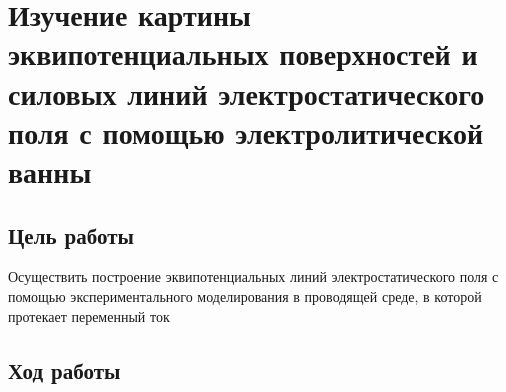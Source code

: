 \chapter{Изучение картины эквипотенциальных поверхностей и силовых	линий электростатического поля с помощью электролитической ванны}

\section{Цель работы}

Осуществить построение эквипотенциальных линий электростатического поля с помощью экспериментального моделирования в проводящей среде, в которой протекает переменный ток

\section{Ход работы}